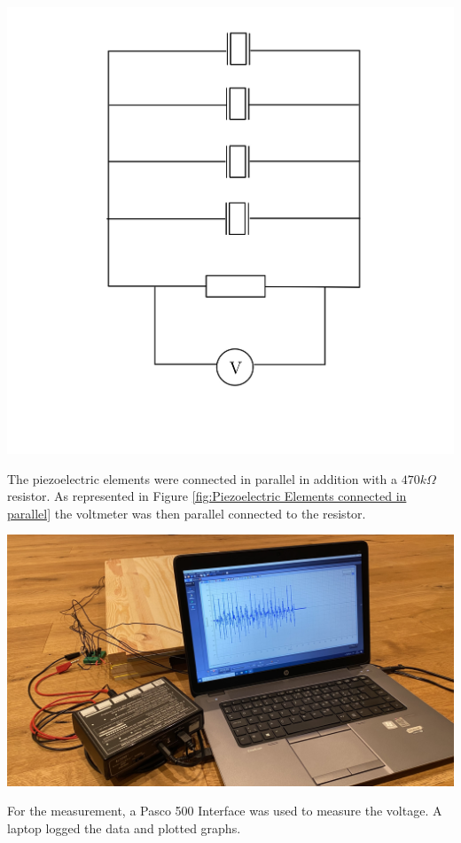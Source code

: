 \begin{minipage}{0.33\textwidth}
    \includegraphics[width=\textwidth]{./Figure_9.jpg}
    \label{fig:Circuit Diagram}
\end{minipage}
\begin{minipage}{0.33\textwidth}
    The piezoelectric elements were connected in parallel in addition with a $470k\Omega$ resistor. As represented in Figure \ref{fig:Piezoelectric Elements connected in parallel} the voltmeter was then parallel connected to the resistor.\\
\end{minipage}
\begin{minipage}{0.33\textwidth}
    \includegraphics[width=\textwidth]{./Figure_10.jpg}
    \label{fig:Laptop and Pasco Interface 500}
\end{minipage}
\begin{minipage}{0.66\textwidth}
    For the measurement, a Pasco 500 Interface was used to measure the voltage. A laptop logged the data and plotted graphs.
\end{minipage}
